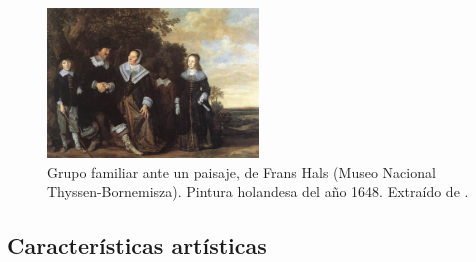 \documentclass[../main.tex]{subfiles}
\begin{document}
\begin{figure}[h!]
    \centering
    \includegraphics[width=0.5\textwidth]{imagenes/Grupo familiar ante un paisaje.jpg}
    \caption[Grupo familiar ante un paisaje, de Frans Hals]{Grupo familiar ante un paisaje, de Frans Hals (Museo Nacional Thyssen-Bornemisza). Pintura holandesa del año 1648. Extraído de \cite{Hals1648}.}
    \label{fig:hals_familia}
\end{figure}

\subsection{Características artísticas}
\end{document}
